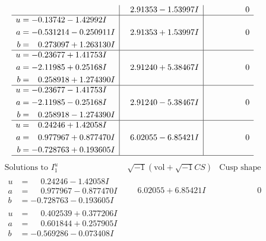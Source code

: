 \documentclass[1p]{elsarticle_modified}
\theoremstyle{definition}
\newcommand{\I}{\sqrt{-1}}
\begin{document}
$$\begin{array}{c|c|c}
 & \phantom{-}2.91353 - 1.53997 I & \phantom{-0.000000 } 0 \\ \hline\begin{aligned}
u &= -0.13742 - 1.42992 I \\
a &= -0.531214 - 0.250911 I \\
b &= \phantom{-}0.273097 + 1.263130 I\end{aligned}
 & \phantom{-}2.91353 + 1.53997 I & \phantom{-0.000000 } 0 \\ \hline\begin{aligned}
u &= -0.23677 + 1.41753 I \\
a &= -2.11985 + 0.25168 I \\
b &= \phantom{-}0.258918 + 1.274390 I\end{aligned}
 & \phantom{-}2.91240 + 5.38467 I & \phantom{-0.000000 } 0 \\ \hline\begin{aligned}
u &= -0.23677 - 1.41753 I \\
a &= -2.11985 - 0.25168 I \\
b &= \phantom{-}0.258918 - 1.274390 I\end{aligned}
 & \phantom{-}2.91240 - 5.38467 I & \phantom{-0.000000 } 0 \\ \hline\begin{aligned}
u &= \phantom{-}0.24246 + 1.42058 I \\
a &= \phantom{-}0.977967 + 0.877470 I \\
b &= -0.728763 + 0.193605 I\end{aligned}
 & \phantom{-}6.02055 - 6.85421 I & \phantom{-0.000000 } 0\\
 \hline 
 \end{array}$$\newpage$$\begin{array}{c|c|c}  
\text{Solutions to }I^u_{1}& \I (\text{vol} + \sqrt{-1}CS) & \text{Cusp shape}\\
 \hline 
\begin{aligned}
u &= \phantom{-}0.24246 - 1.42058 I \\
a &= \phantom{-}0.977967 - 0.877470 I \\
b &= -0.728763 - 0.193605 I\end{aligned}
 & \phantom{-}6.02055 + 6.85421 I & \phantom{-0.000000 } 0 \\ \hline\begin{aligned}
u &= \phantom{-}0.402539 + 0.377206 I \\
a &= \phantom{-}0.601844 + 0.257905 I \\
b &= -0.569286 - 0.073408 I\end{aligned}

\end{array}$$
\end{document}
